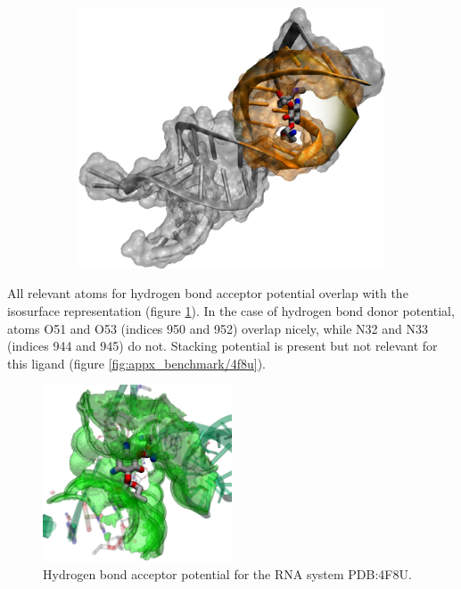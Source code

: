       \begin{figure}[H] \centering
        \begin{subfigure}[c]{0.3\textwidth} \centering
          \includegraphics[width=1\textwidth]{figures/results/ps_rna/4f8u.png}
        \end{subfigure}
        \begin{subfigure}[c]{0.3\textwidth} \centering
        \end{subfigure}
      \end{figure}

      All relevant atoms for hydrogen bond acceptor potential overlap with the isosurface representation (figure \ref{fig:benchmark/4f8u}). In the case of hydrogen bond donor potential, atoms O51 and O53 (indices 950 and 952) overlap nicely, while N32 and N33 (indices 944 and 945) do not. Stacking potential is present but not relevant for this ligand (figure \ref{fig:appx_benchmark/4f8u}).

      \begin{figure}[H]
        \centering
        \includegraphics[width=0.5\textwidth]{figures/results/benchmark_rna/4f8u.png}
        \caption{\label{fig:benchmark/4f8u} Hydrogen bond acceptor potential for the RNA system PDB:4F8U.}
      \end{figure}
    \pagebreak

